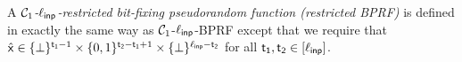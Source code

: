\begin{definition} A \emph{$\mathcal{C}_1$-$\ell_{\mathsf{inp}}$-restricted bit-fixing pseudorandom function (restricted BPRF)} is defined in exactly the same way as $\mathcal{C}_1$-$\ell_{\mathsf{inp}}$-BPRF except that we require that $\hat{\mathsf{x}} \in \{\bot\}^{\mathsf{t_1}-1} \times \{0, 1\}^{\mathsf{t_2}-\mathsf{t_1}+1} \times \{\bot\}^{\ell_{\mathsf{inp}}-\mathsf{t_2}}$ for all $\mathsf{t_1}, \mathsf{t_2} \in [\ell_{\mathsf{inp}}]$.
\end{definition}




